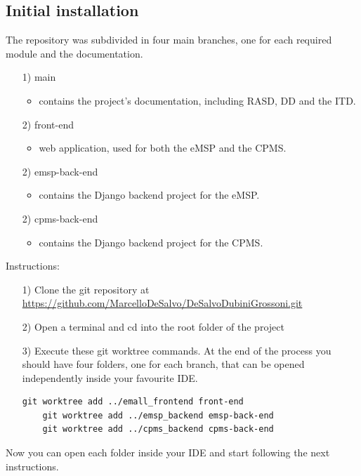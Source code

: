 \documentclass[table, 12pt]{article}
\begin{document}
\subsection{Initial installation}
The repository was subdivided in four main branches, one for each required module and the documentation.
\begin{itemize}
    \item[1)] main
    \begin{itemize}
        \item contains the project's documentation, including RASD, DD and the ITD.
    \end{itemize}
    \item[2)] front-end  
    \begin{itemize}
        \item web application, used for both the eMSP and the CPMS.
    \end{itemize}
    \item[2)] emsp-back-end
    \begin{itemize}
        \item contains the Django backend project for the eMSP.
    \end{itemize}
    \item[2)] cpms-back-end
    \begin{itemize}
        \item contains the Django backend project for the CPMS.
    \end{itemize}
\end{itemize}

Instructions:
\begin{itemize}
    \item[1)] Clone the git repository at \url{https://github.com/MarcelloDeSalvo/DeSalvoDubiniGrossoni.git}
    \item[2)] Open a terminal and cd into the root folder of the project
    \item[3)] Execute these git worktree commands. At the end of the process you should have four folders, one for each branch, that can be opened independently inside your favourite IDE.
    \begin{lstlisting}[language=shell]
    git worktree add ../emall_frontend front-end
    git worktree add ../emsp_backend emsp-back-end
    git worktree add ../cpms_backend cpms-back-end
    \end{lstlisting}
\end{itemize}
Now you can open each folder inside your IDE and start following the next instructions.
\end{document}
